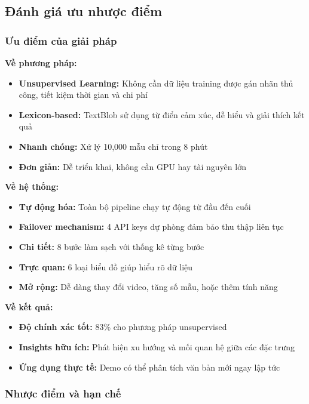 \subsection{Đánh giá ưu nhược điểm}

\subsubsection{Ưu điểm của giải pháp}

\textbf{Về phương pháp:}
\begin{itemize}
    \item \textbf{Unsupervised Learning:} Không cần dữ liệu training được gán nhãn thủ công, tiết kiệm thời gian và chi phí
    \item \textbf{Lexicon-based:} TextBlob sử dụng từ điển cảm xúc, dễ hiểu và giải thích kết quả
    \item \textbf{Nhanh chóng:} Xử lý 10,000 mẫu chỉ trong 8 phút
    \item \textbf{Đơn giản:} Dễ triển khai, không cần GPU hay tài nguyên lớn
\end{itemize}

\textbf{Về hệ thống:}
\begin{itemize}
    \item \textbf{Tự động hóa:} Toàn bộ pipeline chạy tự động từ đầu đến cuối
    \item \textbf{Failover mechanism:} 4 API keys dự phòng đảm bảo thu thập liên tục
    \item \textbf{Chi tiết:} 8 bước làm sạch với thống kê từng bước
    \item \textbf{Trực quan:} 6 loại biểu đồ giúp hiểu rõ dữ liệu
    \item \textbf{Mở rộng:} Dễ dàng thay đổi video, tăng số mẫu, hoặc thêm tính năng
\end{itemize}

\textbf{Về kết quả:}
\begin{itemize}
    \item \textbf{Độ chính xác tốt:} 83\% cho phương pháp unsupervised
    \item \textbf{Insights hữu ích:} Phát hiện xu hướng và mối quan hệ giữa các đặc trưng
    \item \textbf{Ứng dụng thực tế:} Demo có thể phân tích văn bản mới ngay lập tức
\end{itemize}

\subsubsection{Nhược điểm và hạn chế}

